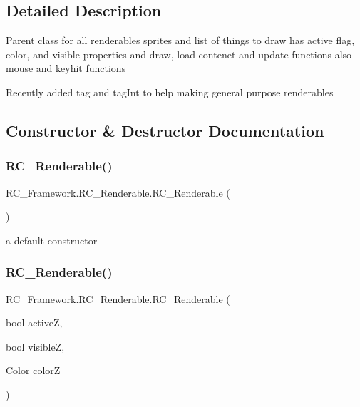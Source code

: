 \subsection{Detailed Description}
Parent class for all renderables sprites and list of things to draw has active flag, color, and visible properties and draw, load contenet and update functions also mouse and keyhit functions 

Recently added tag and tag\+Int to help making general purpose renderables 

\subsection{Constructor \& Destructor Documentation}
\mbox{\label{class_r_c___framework_1_1_r_c___renderable_af2c1d0e50a166ca2bd5137dafc7ab105}} 
\subsubsection{\texorpdfstring{R\+C\+\_\+\+Renderable()}{RC\_Renderable()}\hspace{0.1cm}{\footnotesize\ttfamily [1/3]}}
{\footnotesize\ttfamily R\+C\+\_\+\+Framework.\+R\+C\+\_\+\+Renderable.\+R\+C\+\_\+\+Renderable (\begin{DoxyParamCaption}{ }\end{DoxyParamCaption})}



a default constructor 

\mbox{\label{class_r_c___framework_1_1_r_c___renderable_a2f171037bc65e22991e1e4d32ecd8154}} 
\subsubsection{\texorpdfstring{R\+C\+\_\+\+Renderable()}{RC\_Renderable()}\hspace{0.1cm}{\footnotesize\ttfamily [2/3]}}
{\footnotesize\ttfamily R\+C\+\_\+\+Framework.\+R\+C\+\_\+\+Renderable.\+R\+C\+\_\+\+Renderable (\begin{DoxyParamCaption}\item[{bool}]{activeZ,  }\item[{bool}]{visibleZ,  }\item[{Color}]{colorZ }\end{DoxyParamCaption})}



